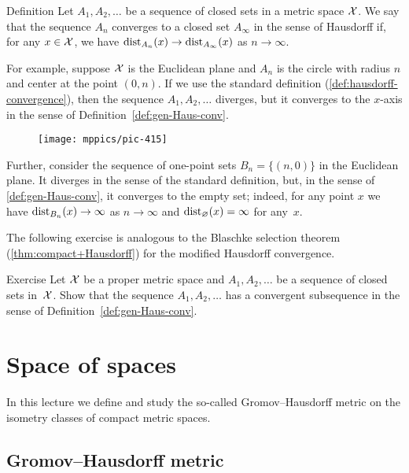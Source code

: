\begin{thm}{Definition}\label{def:gen-Haus-conv}
Let $A_1,A_2,\dots$ be a sequence of closed sets in a metric space $\mathcal{X}$.
We say that the sequence $A_n$ converges to a closed set $A_\infty$ in the sense of Hausdorff if, for any $x\in\mathcal{X}$, we have
$\distfun_{A_n}(x)\z\to \distfun_{A_\infty}(x)$ as $n\to\infty$.
\end{thm}

For example, suppose $\mathcal{X}$ is the Euclidean plane and $A_n$ is the circle with radius $n$ and center at the point $(0,n)$.
If we use the standard definition (\ref{def:hausdorff-convergence}), then the sequence $A_1,A_2,\dots$ diverges, but it converges to the $x$-axis in the sense of Definition~\ref{def:gen-Haus-conv}.

\begin{figure}[ht!]
\vskip-0mm
\centering
\texttt{[image: mppics/pic-415]}
\end{figure}

Further, consider the sequence of one-point sets $B_n=\{(n,0)\}$ in the Euclidean plane.
It diverges in the sense of the standard definition, but, in the sense of \ref{def:gen-Haus-conv}, it converges to the empty set;
indeed, for any point $x$ we have $\mathrm{dist}_{B_n}(x)\to\infty$ as $n\to \infty$ and $\mathrm{dist}_{\varnothing}(x)= \infty$ for any~$x$.

The following exercise is analogous to the Blaschke selection theorem (\ref{thm:compact+Hausdorff}) for the modified Hausdorff convergence.

\begin{thm}{Exercise}\label{ex:generalized-selection}
Let $\mathcal{X}$ be a proper metric space
and $A_1,A_2,\dots$ be a sequence of closed sets in~$\mathcal{X}$.
Show that the sequence  $A_1,A_2,\dots$ has a convergent subsequence in the sense of Definition~\ref{def:gen-Haus-conv}.
\end{thm}

\chapter{Space of spaces}\label{chap:GH}

In this lecture we define and study the so-called Gromov--Hausdorff metric on the isometry classes of compact metric spaces.

\section{Gromov--Hausdorff metric}

